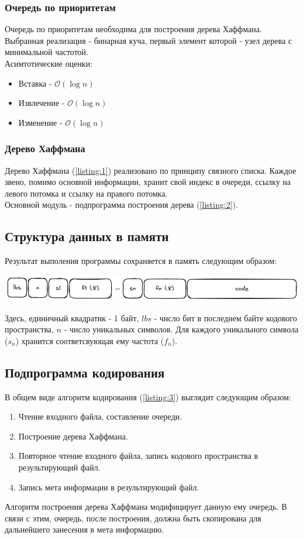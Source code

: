 \documentclass[12pt, a4paper]{article}
\begin{document}
\subsubsection{Очередь по приоритетам}
Очередь по приоритетам необходима для построения дерева Хаффмана.
Выбранная реализация - бинарная куча, первый элемент которой - узел дерева
с минимальной частотой.\\
Асимтотические оценки:
\begin{itemize}
  \item Вставка - $\mathcal{O}(\log{n})$
  \item Извлечение - $\mathcal{O}(\log{n})$ 
  \item Изменение - $\mathcal{O}(\log{n})$
\end{itemize}
\subsubsection{Дерево Хаффмана}
Дерево Хаффмана (\ref{listing:1}) реализовано по принципу связного списка. Каждое звено,
помимо основной информации, хранит свой индекс в очереди,
ссылку на левого потомка и ссылку на правого потомка.\\
Основной модуль - подпрограмма построения дерева (\ref{listing:2}).
\subsection{Структура данных в памяти}
Результат выполения программы сохраняется в память следующим образом:
\begin{center}
  \includegraphics[scale=0.45]{mem.png}
\end{center}
Здесь, единичный квадратик - 1 байт, $lbs$ - число бит в последнем байте
кодового пространства, $n$ - число уникальных символов. Для каждого
уникального символа ($s_n$) хранится соответсвующая ему частота ($f_n$).
\subsection{Подпрограмма кодирования}
В общем виде алгоритм кодирования (\ref{listing:3}) выглядит следующим образом:
\begin{enumerate}
  \item Чтение входного файла, составление очереди.
  \item Построение дерева Хаффмана.
  \item Повторное чтение входного файла, запись кодового пространства в
  результирующий файл.
  \item Запись мета информации в результирующий файл.
\end{enumerate}
Алгоритм построения дерева Хаффмана модифицирует данную ему очередь. В
связи с этим, очередь, после построения, должна быть скопирована для
дальнейшего занесения в мета информацию.
\end{document}
